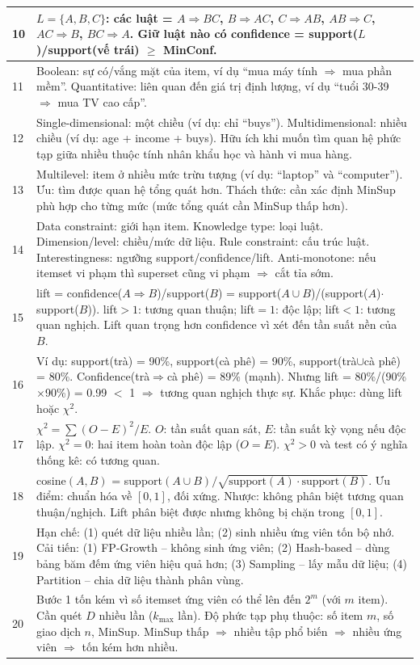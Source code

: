 \documentclass[10pt]{article}
\begin{document}
\begin{singlespace}
\begin{longtable}{|p{}|p{}|}
\hline
10 & $L=\{A,B,C\}$: các luật = $A \Rightarrow BC$, $B \Rightarrow AC$, $C \Rightarrow AB$, $AB \Rightarrow C$, $AC \Rightarrow B$, $BC \Rightarrow A$. Giữ luật nào có confidence = support($L$)/support(vế trái) $\geq$ MinConf. \\
\hline
11 & Boolean: sự có/vắng mặt của item, ví dụ ``mua máy tính $\Rightarrow$ mua phần mềm''. Quantitative: liên quan đến giá trị định lượng, ví dụ ``tuổi 30-39 $\Rightarrow$ mua TV cao cấp''. \\
\hline
12 & Single-dimensional: một chiều (ví dụ: chỉ ``buys''). Multidimensional: nhiều chiều (ví dụ: age + income + buys). Hữu ích khi muốn tìm quan hệ phức tạp giữa nhiều thuộc tính nhân khẩu học và hành vi mua hàng. \\
\hline
13 & Multilevel: item ở nhiều mức trừu tượng (ví dụ: ``laptop'' và ``computer''). Ưu: tìm được quan hệ tổng quát hơn. Thách thức: cần xác định MinSup phù hợp cho từng mức (mức tổng quát cần MinSup thấp hơn). \\
\hline
14 & Data constraint: giới hạn item. Knowledge type: loại luật. Dimension/level: chiều/mức dữ liệu. Rule constraint: cấu trúc luật. Interestingness: ngưỡng support/confidence/lift. Anti-monotone: nếu itemset vi phạm thì superset cũng vi phạm $\Rightarrow$ cắt tỉa sớm. \\
\hline
15 & lift = confidence($A \Rightarrow B$)/support($B$) = support($A \cup B$)/(support($A$)$\cdot$support($B$)). lift$>1$: tương quan thuận; lift$=1$: độc lập; lift$<1$: tương quan nghịch. Lift quan trọng hơn confidence vì xét đến tần suất nền của $B$. \\
\hline
16 & Ví dụ: support(trà) = 90\%, support(cà phê) = 90\%, support(trà$\cup$cà phê) = 80\%. Confidence(trà$\Rightarrow$cà phê) = 89\% (mạnh). Nhưng lift = 80\%/(90\%$\times$90\%) = 0.99 $<$ 1 $\Rightarrow$ tương quan nghịch thực sự. Khắc phục: dùng lift hoặc $\chi^2$. \\
\hline
17 & $\chi^2 = \sum(O-E)^2/E$. $O$: tần suất quan sát, $E$: tần suất kỳ vọng nếu độc lập. $\chi^2=0$: hai item hoàn toàn độc lập ($O=E$). $\chi^2>0$ và test có ý nghĩa thống kê: có tương quan. \\
\hline
18 & cosine$(A,B)$ = support$(A \cup B)/\sqrt{\text{support}(A)\cdot\text{support}(B)}$. Ưu điểm: chuẩn hóa về $[0,1]$, đối xứng. Nhược: không phân biệt tương quan thuận/nghịch. Lift phân biệt được nhưng không bị chặn trong $[0,1]$. \\
\hline
19 & Hạn chế: (1) quét dữ liệu nhiều lần; (2) sinh nhiều ứng viên tốn bộ nhớ. Cải tiến: (1) FP-Growth -- không sinh ứng viên; (2) Hash-based -- dùng bảng băm đếm ứng viên hiệu quả hơn; (3) Sampling -- lấy mẫu dữ liệu; (4) Partition -- chia dữ liệu thành phân vùng. \\
\hline
20 & Bước 1 tốn kém vì số itemset ứng viên có thể lên đến $2^m$ (với $m$ item). Cần quét $D$ nhiều lần ($k_{\max}$ lần). Độ phức tạp phụ thuộc: số item $m$, số giao dịch $n$, MinSup. MinSup thấp $\Rightarrow$ nhiều tập phổ biến $\Rightarrow$ nhiều ứng viên $\Rightarrow$ tốn kém hơn nhiều. \\
\hline
\end{longtable}
\end{singlespace}
\end{document}
